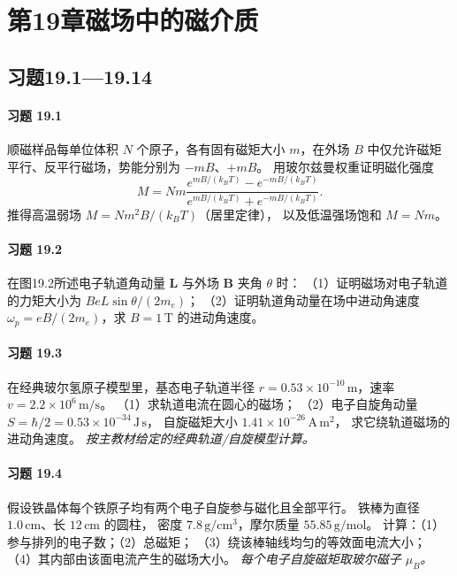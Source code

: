 \section*{第19章\quad 磁场中的磁介质}
\subsection*{习题19.1—19.14}

\paragraph{习题 19.1}
顺磁样品每单位体积 \(N\) 个原子，各有固有磁矩大小 \(m\)，在外场
\(B\) 中仅允许磁矩平行、反平行磁场，势能分别为 \(-mB\)、\(+mB\)。
用玻尔兹曼权重证明磁化强度
\[
 M=Nm\frac{e^{mB/(k_BT)}-e^{-mB/(k_BT)}}
 {e^{mB/(k_BT)}+e^{-mB/(k_BT)}}.
\]
推得高温弱场 \(M=Nm^2B/(k_BT)\)（居里定律），
以及低温强场饱和 \(M=Nm\)。

\paragraph{习题 19.2}
在图19.2所述电子轨道角动量 \(\boldsymbol L\)
与外场 \(\boldsymbol B\) 夹角 \(\theta\) 时：
（1）证明磁场对电子轨道的力矩大小为
\(BeL\sin\theta/(2m_e)\)；
（2）证明轨道角动量在场中进动角速度
\(\omega_p=eB/(2m_e)\)，求 \(B=1\,\mathrm T\) 的进动角速度。

\paragraph{习题 19.3}
在经典玻尔氢原子模型里，基态电子轨道半径
\(r=0.53\times10^{-10}\,\mathrm m\)，速率
\(v=2.2\times10^6\,\mathrm{m/s}\)。
（1）求轨道电流在圆心的磁场；
（2）电子自旋角动量
\(S=\hbar/2=0.53\times10^{-34}\,\mathrm{J\,s}\)，
自旋磁矩大小
\(1.41\times10^{-26}\,\mathrm{A\,m^2}\)，
求它绕轨道磁场的进动角速度。
\textit{按主教材给定的经典轨道/自旋模型计算。}

\paragraph{习题 19.4}
假设铁晶体每个铁原子均有两个电子自旋参与磁化且全部平行。
铁棒为直径 \(1.0\,\mathrm{cm}\)、长 \(12\,\mathrm{cm}\) 的圆柱，
密度 \(7.8\,\mathrm{g/cm^3}\)，摩尔质量
\(55.85\,\mathrm{g/mol}\)。
计算：（1）参与排列的电子数；（2）总磁矩；
（3）绕该棒轴线均匀的等效面电流大小；
（4）其内部由该面电流产生的磁场大小。
\textit{每个电子自旋磁矩取玻尔磁子 \(\mu_B\)。}


